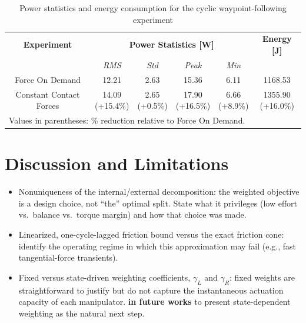 \documentclass[conference]{IEEEtran}
\begin{document}
\begin{table}[htbp]
\caption{Power statistics and energy consumption for the cyclic waypoint-following experiment}
\label{tab:power_statistics}
\centering
\small
\setlength{\tabcolsep}{3pt}
\begin{tabular}{|c|c|c|c|c|c|}
\hline
\textbf{Experiment} & \multicolumn{4}{c|}{\textbf{Power Statistics [W]}} & \textbf{Energy [J]} \\
\cline{2-5}
 & \textit{RMS} & \textit{Std} & \textit{Peak} & \textit{Min} &  \\
\hline
Force On Demand & 12.21 & 2.63 & 15.36 & 6.11 & 1168.53 \\
\hline
Constant Contact Forces & \makecell{14.09 \\ \scriptsize(+15.4\%)} & \makecell{2.65 \\ \scriptsize(+0.5\%)} & \makecell{17.90 \\ \scriptsize(+16.5\%)} & \makecell{6.66 \\ \scriptsize(+8.9\%)} & \makecell{1355.90 \\ \scriptsize(+16.0\%)} \\
\hline
\multicolumn{6}{l}{\scriptsize Values in parentheses: \% reduction relative to Force On Demand.}
\end{tabular}
\end{table}










\section{Discussion and Limitations}
\begin{itemize}
    \item Nonuniqueness of the internal/external decomposition: the weighted objective is a design choice, not ``the'' optimal split. State what it privileges (low effort vs.\ balance vs.\ torque margin) and how that choice was made.
    \item Linearized, one-cycle-lagged friction bound versus the exact friction cone: identify the operating regime in which this approximation may fail (e.g., fast tangential-force transients).
    \item Fixed versus state-driven weighting coefficients, \(\gamma_L\) and \(\gamma_R\): fixed weights are straightforward to justify but do not capture the instantaneous actuation capacity of each manipulator. \textbf{in future works} to present state-dependent weighting as the natural next step.
\end{itemize}
\end{document}
